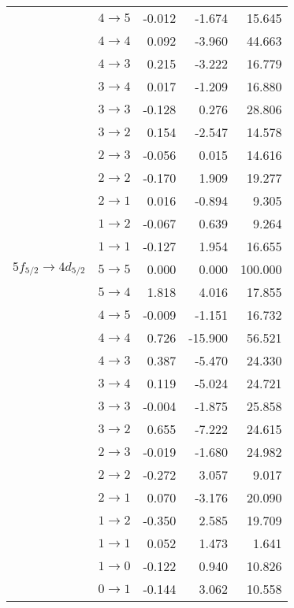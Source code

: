 \begin{table}[b]
\begin{tiny}
\begin{tabular}{cc|rrr}
 & $4 \rightarrow 5$ &-0.012&-1.674&15.645\\
 & $4 \rightarrow 4$ &0.092&-3.960&44.663\\
 & $4 \rightarrow 3$ &0.215&-3.222&16.779\\
 & $3 \rightarrow 4$ &0.017&-1.209&16.880\\
 & $3 \rightarrow 3$ &-0.128&0.276&28.806\\
 & $3 \rightarrow 2$ &0.154&-2.547&14.578\\
 & $2 \rightarrow 3$ &-0.056&0.015&14.616\\
 & $2 \rightarrow 2$ &-0.170&1.909&19.277\\
 & $2 \rightarrow 1$ &0.016&-0.894&9.305\\
 & $1 \rightarrow 2$ &-0.067&0.639&9.264\\
 & $1 \rightarrow 1$ &-0.127&1.954&16.655\\[4pt]
$5f_{5/2} \rightarrow 4d_{5/2}$ & $5 \rightarrow 5$ &0.000&0.000&100.000\\
 & $5 \rightarrow 4$ &1.818&4.016&17.855\\
 & $4 \rightarrow 5$ &-0.009&-1.151&16.732\\
 & $4 \rightarrow 4$ &0.726&-15.900&56.521\\
 & $4 \rightarrow 3$ &0.387&-5.470&24.330\\
 & $3 \rightarrow 4$ &0.119&-5.024&24.721\\
 & $3 \rightarrow 3$ &-0.004&-1.875&25.858\\
 & $3 \rightarrow 2$ &0.655&-7.222&24.615\\
 & $2 \rightarrow 3$ &-0.019&-1.680&24.982\\
 & $2 \rightarrow 2$ &-0.272&3.057&9.017\\
 & $2 \rightarrow 1$ &0.070&-3.176&20.090\\
 & $1 \rightarrow 2$ &-0.350&2.585&19.709\\
 & $1 \rightarrow 1$ &0.052&1.473&1.641\\
 & $1 \rightarrow 0$ &-0.122&0.940&10.826\\
 & $0 \rightarrow 1$ &-0.144&3.062&10.558
\end{tabular}
\end{tiny}
\end{table}%
%